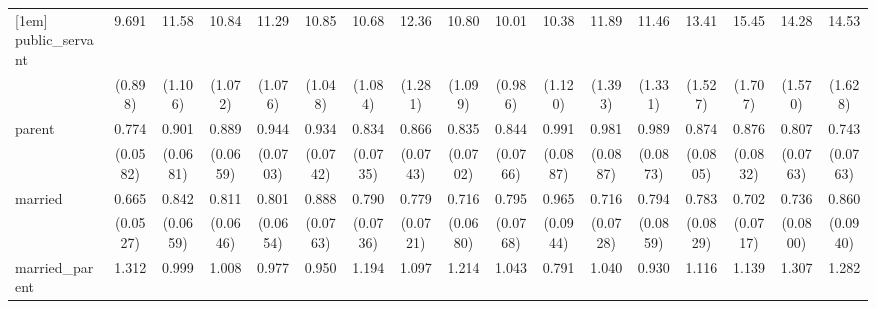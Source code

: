 {\begin{tabular}{l*{16}{c}}
[1em]
public\_servant      &       9.691\sym{***}&       11.58\sym{***}&       10.84\sym{***}&       11.29\sym{***}&       10.85\sym{***}&       10.68\sym{***}&       12.36\sym{***}&       10.80\sym{***}&       10.01\sym{***}&       10.38\sym{***}&       11.89\sym{***}&       11.46\sym{***}&       13.41\sym{***}&       15.45\sym{***}&       14.28\sym{***}&       14.53\sym{***}\\
                    &     (0.898)         &     (1.106)         &     (1.072)         &     (1.076)         &     (1.048)         &     (1.084)         &     (1.281)         &     (1.099)         &     (0.986)         &     (1.120)         &     (1.393)         &     (1.331)         &     (1.527)         &     (1.707)         &     (1.570)         &     (1.628)         \\
[1em]
parent              &       0.774\sym{***}&       0.901         &       0.889         &       0.944         &       0.934         &       0.834\sym{*}  &       0.866         &       0.835\sym{*}  &       0.844         &       0.991         &       0.981         &       0.989         &       0.874         &       0.876         &       0.807\sym{*}  &       0.743\sym{**} \\
                    &    (0.0582)         &    (0.0681)         &    (0.0659)         &    (0.0703)         &    (0.0742)         &    (0.0735)         &    (0.0743)         &    (0.0702)         &    (0.0766)         &    (0.0887)         &    (0.0887)         &    (0.0873)         &    (0.0805)         &    (0.0832)         &    (0.0763)         &    (0.0763)         \\
[1em]
married             &       0.665\sym{***}&       0.842\sym{*}  &       0.811\sym{**} &       0.801\sym{**} &       0.888         &       0.790\sym{*}  &       0.779\sym{**} &       0.716\sym{***}&       0.795\sym{*}  &       0.965         &       0.716\sym{**} &       0.794\sym{*}  &       0.783\sym{*}  &       0.702\sym{***}&       0.736\sym{**} &       0.860         \\
                    &    (0.0527)         &    (0.0659)         &    (0.0646)         &    (0.0654)         &    (0.0763)         &    (0.0736)         &    (0.0721)         &    (0.0680)         &    (0.0768)         &    (0.0944)         &    (0.0728)         &    (0.0859)         &    (0.0829)         &    (0.0717)         &    (0.0800)         &    (0.0940)         \\
[1em]
married\_parent      &       1.312\sym{**} &       0.999         &       1.008         &       0.977         &       0.950         &       1.194         &       1.097         &       1.214         &       1.043         &       0.791         &       1.040         &       0.930         &       1.116         &       1.139         &       1.307         &       1.282         \\

\end{tabular}}
